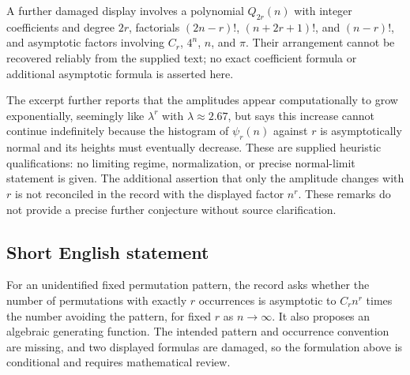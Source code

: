 \documentclass[11pt]{article}
\begin{document}
A further damaged display involves a polynomial \(Q_{2r}(n)\) with integer coefficients and degree \(2r\), factorials \((2n-r)!\), \((n+2r+1)!\), and \((n-r)!\), and asymptotic factors involving \(C_r\), \(4^n\), \(n\), and \(\pi\). Their arrangement cannot be recovered reliably from the supplied text; no exact coefficient formula or additional asymptotic formula is asserted here.

The excerpt further reports that the amplitudes appear computationally to grow exponentially, seemingly like \(\lambda^r\) with \(\lambda\approx2.67\), but says this increase cannot continue indefinitely because the histogram of \(\psi_r(n)\) against \(r\) is asymptotically normal and its heights must eventually decrease. These are supplied heuristic qualifications: no limiting regime, normalization, or precise normal-limit statement is given. The additional assertion that only the amplitude changes with \(r\) is not reconciled in the record with the displayed factor \(n^r\). These remarks do not provide a precise further conjecture without source clarification.
\subsection{Short English statement}
For an unidentified fixed permutation pattern, the record asks whether the number of permutations with exactly \(r\) occurrences is asymptotic to \(C_r n^r\) times the number avoiding the pattern, for fixed \(r\) as \(n\to\infty\). It also proposes an algebraic generating function. The intended pattern and occurrence convention are missing, and two displayed formulas are damaged, so the formulation above is conditional and requires mathematical review.
\end{document}
